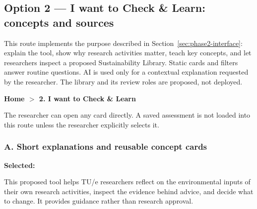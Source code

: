 \documentclass[11pt,a4paper]{article}
\begin{document}
\subsection{Option 2 --- I want to Check \& Learn: concepts and sources}
\label{sec:learn-dialogue}
This route implements the purpose described in Section~\ref{sec:phase2-interface}: explain the tool, show why research activities matter, teach key concepts, and let researchers inspect a proposed Sustainability Library. Static cards and filters answer routine questions. AI is used only for a contextual explanation requested by the researcher. The library and its review roles are proposed, not deployed.


\begin{learnscreen}
\textbf{Home $>$ 2. I want to Check \& Learn}\par\medskip
{}\quad
{}\quad
{}\quad
{}\quad
{}\par\medskip
The researcher can open any card directly. A saved assessment is not loaded into this route unless the researcher explicitly selects it.
\end{learnscreen}

\subsubsection*{A. Short explanations and reusable concept cards}
\begin{learnscreen}
\textbf{Selected:} \par
This proposed tool helps TU/e researchers reflect on the environmental inputs of their own research activities, inspect the evidence behind advice, and decide what to change. It provides guidance rather than research approval.\par\medskip
{}\quad
{}\quad
{}
\end{learnscreen}
\end{document}
